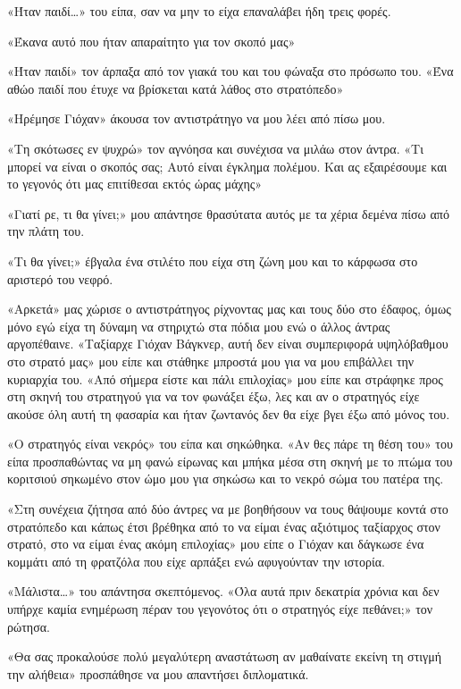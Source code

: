 \documentclass[12pt,twoside, openany]{book}
\begin{document}
«Ήταν παιδί…» του είπα, σαν να μην το είχα επαναλάβει ήδη τρεις φορές.

«Έκανα αυτό που ήταν απαραίτητο για τον σκοπό μας»

«Ήταν παιδί» τον άρπαξα από τον γιακά του και του φώναξα στο πρόσωπο του. «Ένα αθώο παιδί που έτυχε να βρίσκεται κατά λάθος στο στρατόπεδο»

«Ηρέμησε Γιόχαν» άκουσα τον αντιστράτηγο να μου λέει από πίσω μου.

«Τη σκότωσες εν ψυχρώ» τον αγνόησα και συνέχισα να μιλάω στον άντρα. «Τι μπορεί να είναι ο σκοπός σας; Αυτό είναι έγκλημα πολέμου. Και ας εξαιρέσουμε και το γεγονός ότι μας επιτίθεσαι εκτός ώρας μάχης»

«Γιατί ρε, τι θα γίνει;» μου απάντησε θρασύτατα αυτός με τα χέρια δεμένα πίσω από την πλάτη του.

«Τι θα γίνει;» έβγαλα ένα στιλέτο που είχα στη ζώνη μου και το κάρφωσα στο αριστερό του νεφρό.

«Αρκετά» μας χώρισε ο αντιστράτηγος ρίχνοντας μας και τους δύο στο έδαφος, όμως μόνο εγώ είχα τη δύναμη να στηριχτώ στα πόδια μου ενώ ο άλλος άντρας αργοπέθαινε. «Ταξίαρχε Γιόχαν Βάγκνερ, αυτή δεν είναι συμπεριφορά υψηλόβαθμου στο στρατό μας» μου είπε και στάθηκε μπροστά μου για να μου επιβάλλει την κυριαρχία του. «Από σήμερα είστε και πάλι επιλοχίας» μου είπε και στράφηκε προς στη σκηνή του στρατηγού για να τον φωνάξει έξω, λες και αν ο στρατηγός είχε ακούσε όλη αυτή τη φασαρία και ήταν ζωντανός δεν θα είχε βγει έξω από μόνος του.

«Ο στρατηγός είναι νεκρός» του είπα και σηκώθηκα. «Αν θες πάρε τη θέση του» του είπα προσπαθώντας να μη φανώ είρωνας και μπήκα μέσα στη σκηνή με το πτώμα του κοριτσιού σηκωμένο στον ώμο μου για σηκώσω και το νεκρό σώμα του πατέρα της.\newline\newline

«Στη συνέχεια ζήτησα από δύο άντρες να με βοηθήσουν να τους θάψουμε κοντά στο στρατόπεδο και κάπως έτσι βρέθηκα από το να είμαι ένας αξιότιμος ταξίαρχος στον στρατό, στο να είμαι ένας ακόμη επιλοχίας» μου είπε ο Γιόχαν και δάγκωσε ένα κομμάτι από τη φρατζόλα που είχε αρπάξει ενώ αφυγούνταν την ιστορία.

«Μάλιστα…» του απάντησα σκεπτόμενος. «Όλα αυτά πριν δεκατρία χρόνια και δεν υπήρχε καμία ενημέρωση πέραν του γεγονότος ότι ο στρατηγός είχε πεθάνει;» τον ρώτησα.

«Θα σας προκαλούσε πολύ μεγαλύτερη αναστάτωση αν μαθαίνατε εκείνη τη στιγμή την αλήθεια» προσπάθησε να μου απαντήσει διπλοματικά.
\end{document}

